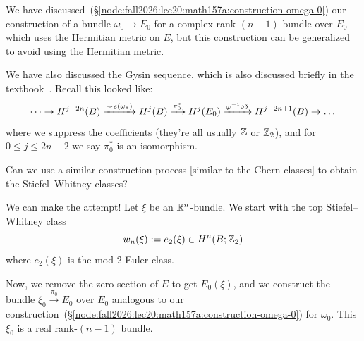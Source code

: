 
\lecture{}


\begin{node}
We have discussed~(\S\ref{node:fall2026:lec20:math157a:construction-omega-0}) our construction of a bundle $\omega_{0}\to E_{0}$
for a complex rank-$(n-1)$ bundle over $E_{0}$ which uses the
Hermitian metric on $E$, but this construction can be generalized to
avoid using the Hermitian metric.
\end{node}

\begin{node}
We have also discussed the Gysin sequence, which is also discussed briefly in the textbook~\cite[\S12.1]{milnor1974characteristic}.
Recall this looked like:
\begin{equation}
\dots\to H^{j-2n}(B)\xrightarrow{\smile e(\omega_{\mathbb{R}})}H^{j}(B)\xrightarrow{\pi_{0}^{*}}H^{j}(E_{0})\xrightarrow{\varphi^{-1}\circ\delta}H^{j-2n+1}(B)\to\dots
\end{equation}
where we suppress the coefficients (they're all usually $\mathbb{Z}$ or $\mathbb{Z}_{2}$),
and for $0\leq j\leq 2n-2$ we say $\pi_{0}^{*}$ is an isomorphism.
\end{node}

\begin{puzzle}
Can we use a similar construction process [similar to the Chern
classes] to obtain the Stiefel--Whitney classes?
\end{puzzle}

\begin{node}
We can make the attempt! Let $\xi$ be an $\mathbb{R}^{n}$-bundle. We start
with the top Stiefel--Whitney class
\begin{equation}
w_{n}(\xi):=e_{2}(\xi)\in H^{n}(B;\mathbb{Z}_{2})
\end{equation}
where $e_{2}(\xi)$ is the mod-2 Euler class.
\end{node}

\begin{node}
Now, we remove the zero section of $E$ to get $E_{0}(\xi)$, and we
construct the bundle $\xi_{0}\xrightarrow{\pi_{0}} E_{0}$ over $E_{0}$ analogous to our
construction~(\S\ref{node:fall2026:lec20:math157a:construction-omega-0})
for $\omega_{0}$. This $\xi_{0}$ is a real rank-$(n-1)$ bundle.
\end{node}

